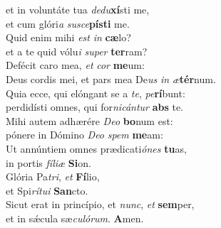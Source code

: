 \oddverse  et in voluntáte tua \textit{de}\textit{du}\textbf{xí}sti me,~\*\\
\oddverse et cum glóri\textit{a} \textit{su}\textit{sce}\textbf{pí}\textbf{sti} me.\\
\evenverse Quid enim mihi \textit{est} \textit{in} \textbf{cæ}lo?~\*\\
\evenverse et a te quid vólu\textit{i} \textit{su}\textit{per} \textbf{ter}ram?\\
\oddverse Defécit caro mea, \textit{et} \textit{cor} \textbf{me}um:~\*\\
\oddverse Deus cordis mei, et pars mea De\textit{us} \textit{in} \textit{æ}\textbf{tér}num.\\
\evenverse Quia ecce, qui elóngant se a \textit{te}, \textit{pe}\textbf{rí}bunt:~\*\\
\evenverse perdidísti omnes, qui for\textit{ni}\textit{cán}\textit{tur} \textbf{abs} te.\\
\oddverse Mihi autem adhærére \textit{De}\textit{o} \textbf{bo}num est:~\*\\
\oddverse pónere in Dómino \textit{De}\textit{o} \textit{spem} \textbf{me}am:\\
\evenverse Ut annúntiem omnes prædicati\textit{ó}\textit{nes} \textbf{tu}as,~\*\\
\evenverse in portis \textit{fí}\textit{li}\textit{æ} \textbf{Si}on.\\
\oddverse Glória Pa\textit{tri}, \textit{et} \textbf{Fí}lio,~\*\\
\oddverse et Spi\textit{rí}\textit{tu}\textit{i} \textbf{San}cto.\\
\evenverse Sicut erat in princípio, et \textit{nunc}, \textit{et} \textbf{sem}per,~\*\\
\evenverse et in sǽcula sæ\textit{cu}\textit{ló}\textit{rum}. \textbf{A}men.\\
